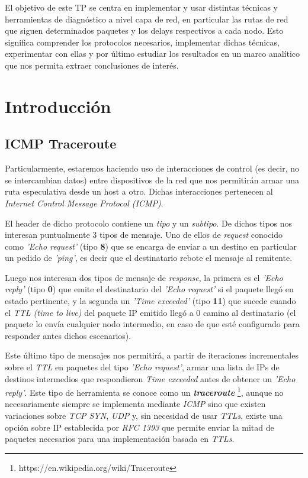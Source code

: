 El objetivo de este TP se centra en implementar y usar distintas técnicas y herramientas de diagnóstico a nivel capa de red, en particular las rutas de red que siguen determinados paquetes y los delays respectivos a cada nodo. Esto significa comprender los protocolos necesarios, implementar dichas técnicas, experimentar con ellas y por último estudiar los resultados en un marco analítico que nos permita extraer conclusiones de interés.

\section{Introducción}
\subsection{ICMP Traceroute}

Particularmente, estaremos haciendo uso de interacciones de control (es decir, no se intercambian datos)  entre dispositivos de la red que nos permitirán armar una ruta especulativa desde un host a otro. Dichas interacciones pertenecen al \emph{Internet Control Message Protocol (ICMP)}.

El header de dicho protocolo contiene un \emph{tipo} y un \emph{subtipo}. De dichos tipos nos interesan puntualmente 3 tipos de mensaje. Uno de ellos de \emph{request} conocido como \emph{'Echo request'} (tipo \textbf{8}) que se encarga de enviar a un destino en particular un pedido de \emph{'ping'}, es decir que el destinatario rebote el mensaje al remitente.

Luego nos interesan dos tipos de mensaje de \emph{response}, la primera es el \emph{'Echo reply'} (tipo \textbf{0}) que emite el destinatario del \emph{'Echo request'} si el paquete llegó en estado pertinente, y la segunda un \emph{'Time exceeded'} (tipo \textbf{11}) que sucede cuando el \emph{TTL (time to live)} del paquete IP emitido llegó a 0 camino al destinatario (el paquete lo envía cualquier nodo intermedio, en caso de que esté configurado para responder antes dichos escenarios).

Este último tipo de mensajes nos permitirá, a partir de iteraciones incrementales sobre el \emph{TTL} en paquetes del tipo \emph{'Echo request'}, armar una lista de IPs de destinos intermedios que respondieron \emph{Time exceeded} antes de obtener un \emph{'Echo reply'}. Este tipo de herramienta se conoce como un \emph{\textbf{traceroute}} \footnote{ https://en.wikipedia.org/wiki/Traceroute}, aunque no necesariamente siempre se implementa mediante \emph{ICMP} sino que existen variaciones sobre \emph{TCP SYN}, \emph{UDP} y, sin necesidad de usar \emph{TTLs}, existe una opción sobre IP establecida por \emph{RFC 1393} que permite enviar la mitad de paquetes necesarios para una implementación basada en \emph{TTLs}.

